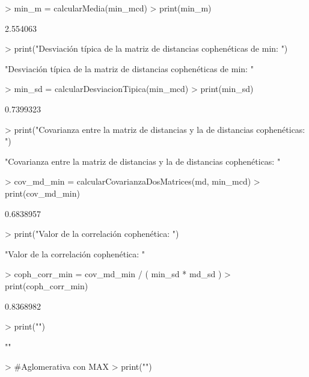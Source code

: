 \documentclass[parskip=full]{scrartcl}
\begin{document}
\begin{Schunk}
\begin{Sinput}
> min_m = calcularMedia(min_mcd)
> print(min_m)
\end{Sinput}
\begin{Soutput}
[1] 2.554063
\end{Soutput}
\begin{Sinput}
> print("Desviación típica de la matriz de distancias cophenéticas de min: ")
\end{Sinput}
\begin{Soutput}
[1] "Desviación típica de la matriz de distancias cophenéticas de min: "
\end{Soutput}
\begin{Sinput}
> min_sd = calcularDesviacionTipica(min_mcd)
> print(min_sd)
\end{Sinput}
\begin{Soutput}
[1] 0.7399323
\end{Soutput}
\begin{Sinput}
> print("Covarianza entre la matriz de distancias y la de distancias cophenéticas: ")
\end{Sinput}
\begin{Soutput}
[1] "Covarianza entre la matriz de distancias y la de distancias cophenéticas: "
\end{Soutput}
\begin{Sinput}
> cov_md_min = calcularCovarianzaDosMatrices(md, min_mcd)
> print(cov_md_min)
\end{Sinput}
\begin{Soutput}
[1] 0.6838957
\end{Soutput}
\begin{Sinput}
> print("Valor de la correlación cophenética: ")
\end{Sinput}
\begin{Soutput}
[1] "Valor de la correlación cophenética: "
\end{Soutput}
\begin{Sinput}
> coph_corr_min = cov_md_min / ( min_sd * md_sd )
> print(coph_corr_min)
\end{Sinput}
\begin{Soutput}
[1] 0.8368982
\end{Soutput}
\begin{Sinput}
> print("")
\end{Sinput}
\begin{Soutput}
[1] ""
\end{Soutput}
\begin{Sinput}
> #Aglomerativa con MAX
> print("")
\end{Sinput}
\begin{Soutput}

\end{Soutput}
\end{Schunk}
\end{document}
